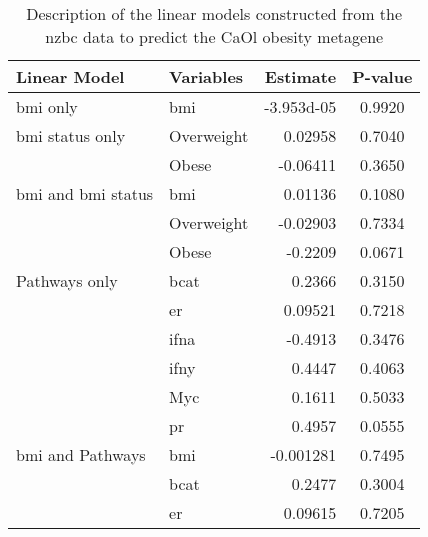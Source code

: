	\begin{table}[htpb]
		\centering
		\caption{Description of the linear models constructed from the \gls{nzbc} data to predict the CaOl obesity metagene}
		\label{tab:lm_sig_var_caol}
		\begin{threeparttable}
			\begin{tabular}{llrc}
				Linear Model & Variables & Estimate & P-value\\
				\hline
				\hline
				\rule{0pt}{2.25ex}\gls{bmi} only                           & \gls{bmi}  & \num{-3.953d-05} & 0.9920 \\
				\hline
				\rule{0pt}{2.25ex}\gls{bmi} status only                    & Overweight & 0.02958    & 0.7040 \\
                                                                           & Obese      & -0.06411   & 0.3650 \\
				\hline
				\rule{0pt}{2.25ex}\gls{bmi} and \gls{bmi} status           & \gls{bmi}  & 0.01136    & 0.1080 \\
                                                                           & Overweight & -0.02903   & 0.7334 \\
                                                                           & Obese      & -0.2209    & 0.0671 \\
				\hline
				\rule{0pt}{2.25ex}Pathways only                            & \gls{bcat} & 0.2366     & 0.3150 \\
                                                                           & \gls{er}   & 0.09521    & 0.7218 \\
                                                                           & \gls{ifna} & -0.4913    & 0.3476 \\
                                                                           & \gls{ifny} & 0.4447     & 0.4063 \\
                                                                           & Myc        & 0.1611     & 0.5033 \\
                                                                           & \gls{pr}   & 0.4957     & 0.0555 \\
				\hline
				\rule{0pt}{2.25ex}\gls{bmi} and Pathways                   & \gls{bmi}  & -0.001281  & 0.7495 \\
                                                                           & \gls{bcat} & 0.2477     & 0.3004 \\
                                                                           & \gls{er}   & 0.09615    & 0.7205 \\

\end{tabular}
\end{threeparttable}
\end{table}
